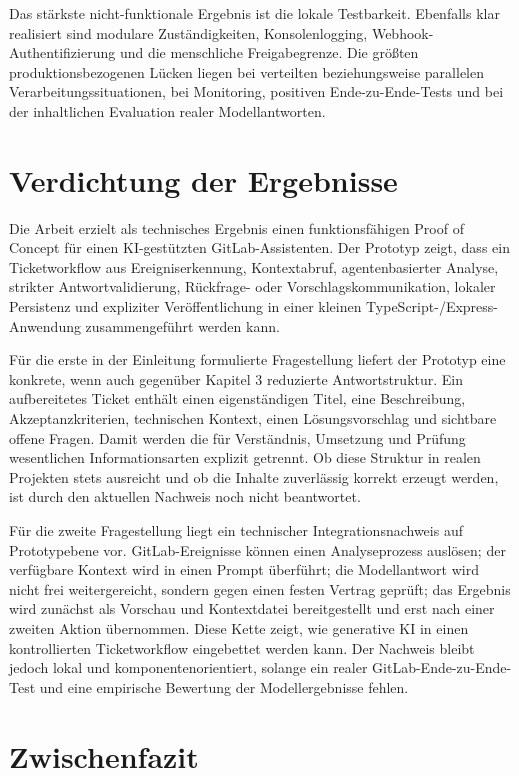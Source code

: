 Das stärkste nicht-funktionale Ergebnis ist die lokale Testbarkeit. Ebenfalls klar realisiert sind modulare Zuständigkeiten, Konsolenlogging, Webhook-Authentifizierung und die menschliche Freigabegrenze. Die größten produktionsbezogenen Lücken liegen bei verteilten beziehungsweise parallelen Verarbeitungssituationen, bei Monitoring, positiven Ende-zu-Ende-Tests und bei der inhaltlichen Evaluation realer Modellantworten.

\section{Verdichtung der Ergebnisse}

Die Arbeit erzielt als technisches Ergebnis einen funktionsfähigen Proof of Concept für einen KI-gestützten GitLab-Assistenten. Der Prototyp zeigt, dass ein Ticketworkflow aus Ereigniserkennung, Kontextabruf, agentenbasierter Analyse, strikter Antwortvalidierung, Rückfrage- oder Vorschlagskommunikation, lokaler Persistenz und expliziter Veröffentlichung in einer kleinen TypeScript-/Express-Anwendung zusammengeführt werden kann.

Für die erste in der Einleitung formulierte Fragestellung liefert der Prototyp eine konkrete, wenn auch gegenüber Kapitel 3 reduzierte Antwortstruktur. Ein aufbereitetes Ticket enthält einen eigenständigen Titel, eine Beschreibung, Akzeptanzkriterien, technischen Kontext, einen Lösungsvorschlag und sichtbare offene Fragen. Damit werden die für Verständnis, Umsetzung und Prüfung wesentlichen Informationsarten explizit getrennt. Ob diese Struktur in realen Projekten stets ausreicht und ob die Inhalte zuverlässig korrekt erzeugt werden, ist durch den aktuellen Nachweis noch nicht beantwortet.

Für die zweite Fragestellung liegt ein technischer Integrationsnachweis auf Prototypebene vor. GitLab-Ereignisse können einen Analyseprozess auslösen; der verfügbare Kontext wird in einen Prompt überführt; die Modellantwort wird nicht frei weitergereicht, sondern gegen einen festen Vertrag geprüft; das Ergebnis wird zunächst als Vorschau und Kontextdatei bereitgestellt und erst nach einer zweiten Aktion übernommen. Diese Kette zeigt, wie generative KI in einen kontrollierten Ticketworkflow eingebettet werden kann. Der Nachweis bleibt jedoch lokal und komponentenorientiert, solange ein realer GitLab-Ende-zu-Ende-Test und eine empirische Bewertung der Modellergebnisse fehlen.

\section{Zwischenfazit}

